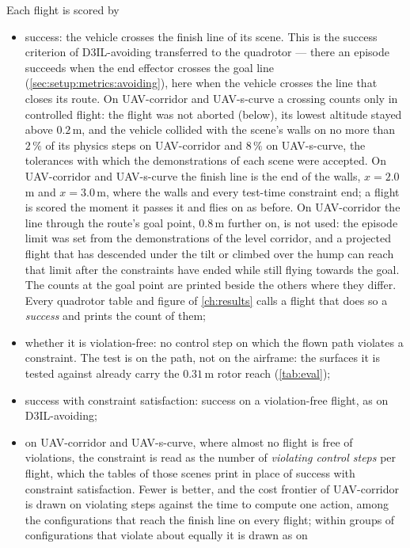 Each flight is scored by
\begin{itemize}
  \item success: the vehicle crosses the finish line of its scene. This is the success
    criterion of D3IL-avoiding transferred to the quadrotor --- there an episode succeeds when the end effector
    crosses the goal line (\autoref{sec:setup:metrics:avoiding}), here when the vehicle crosses the line
    that closes its route. On UAV-corridor and UAV-s-curve a crossing counts only in controlled flight: the
    flight was not aborted (below), its lowest altitude stayed above $0.2$\,m, and the vehicle collided with
    the scene's walls on no more than $2\,\%$ of its physics steps on UAV-corridor and $8\,\%$ on
    UAV-s-curve, the tolerances with which the demonstrations of each scene were accepted. On UAV-corridor
    and UAV-s-curve the finish line is the end of the walls, $x=2.0$\,m and $x=3.0$\,m, where the walls and
    every test-time constraint end; a flight is scored the moment it passes it and flies on as before. On
    UAV-corridor the line through the route's goal point, $0.8$\,m further on, is not used: the episode limit was set from the
    demonstrations of the level corridor, and a projected flight that has descended under the tilt or climbed
    over the hump can reach that limit after the constraints have ended while still flying towards the goal.
    The counts at the goal point are printed beside the others where they differ. Every quadrotor
    table and figure of \autoref{ch:results} calls a flight that does so a \emph{success} and prints the
    count of them;
  \item whether it is violation-free: no control step on which the flown path violates a constraint. The
    test is on the path, not on the airframe: the surfaces it is tested against already carry the
    $0.31$\,m rotor reach (\autoref{tab:eval});
  \item success with constraint satisfaction: success on a violation-free flight, as on
    D3IL-avoiding;
  \item on UAV-corridor and UAV-s-curve, where almost no flight is free of violations, the constraint is read
    as the number of \emph{violating control steps} per flight, which the tables of those scenes print in place
    of success with constraint satisfaction. Fewer is better, and the cost frontier of UAV-corridor is drawn on
    violating steps against the time to compute one action, among the configurations that reach the finish
    line on every flight; within groups of configurations that violate about equally it is drawn as on

\end{itemize}
